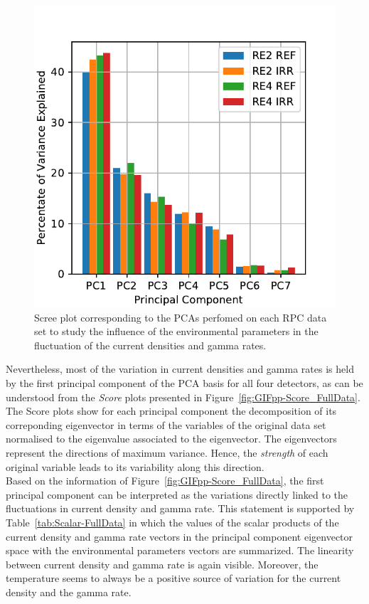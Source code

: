 \begingroup\setlength{\intextsep}{0pt}\setlength{\columnsep}{15pt}

	\begin{figure}
    	\centering
		\includegraphics[width = \linewidth]{fig/chapt5/Scree_plot_Full-Data.pdf}
        \caption{\label{fig:GIFpp-Scree_FullData} Scree plot corresponding to the PCAs perfomed on each RPC data set to study the influence of the environmental parameters in the fluctuation of the current densities and gamma rates.}
	\end{figure}
	
	Nevertheless, most of the variation in current densities and gamma rates is held by the first principal component of the PCA basis for all four detectors, as can be understood from the \textit{Score} plots presented in Figure~\ref{fig:GIFpp-Score_FullData}. The Score plots show for each principal component the decomposition of its correponding eigenvector in terms of the variables of the original data set normalised to the eigenvalue associated to the eigenvector. The eigenvectors represent the directions of maximum variance. Hence, the \textit{strength} of each original variable leads to its variability along this direction.\\
	Based on the information of Figure~\ref{fig:GIFpp-Score_FullData}, the first principal component can be interpreted as the variations directly linked to the fluctuations in current density and gamma rate. This statement is supported by Table~\ref{tab:Scalar-FullData} in which the values of the scalar products of the current density and gamma rate vectors in the principal component eigenvector space with the environmental parameters vectors are summarized. The linearity between current density and gamma rate is again visible. Moreover, the temperature seems to always be a positive source of variation for the current density and the gamma rate.
	
